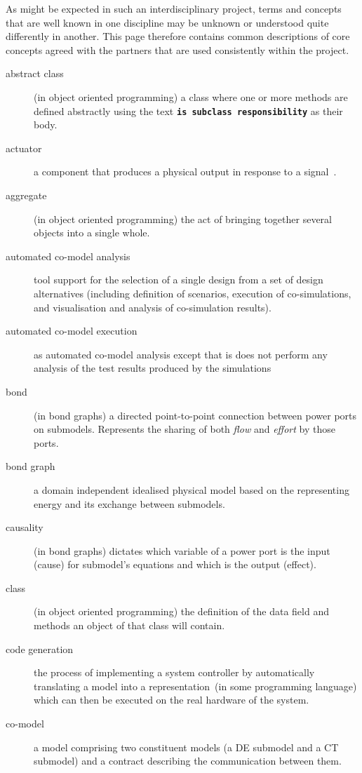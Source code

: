 \documentclass{crescendorepchap}
\begin{document}
As might be expected in such an interdisciplinary project, terms and
concepts that are well known in one discipline may be unknown or
understood quite differently in another. This page therefore contains
common descriptions of core concepts agreed with the partners that are
used consistently within the project.

\begin{description}
\item[abstract class] (in object oriented programming) a class where one or more methods are defined abstractly using the text \textbf{\texttt{is subclass responsibility}} as their body.
\item[actuator] a component that produces a physical output in response to a signal~\cite{IEEE100}.
\item[aggregate] (in object oriented programming) the act of bringing together several objects into a single whole.
\item[automated co-model analysis] tool support for the selection of a single design from a set of design alternatives (including definition of scenarios, execution of co-simulations, and visualisation and analysis of co-simulation results).
\item[automated co-model execution] as automated co-model analysis except that is does not perform any analysis of the test results produced by the simulations
\item[bond] (in bond graphs) a directed point-to-point connection between power ports on submodels.  Represents the sharing of both \textit{flow} and \textit{effort} by those ports.
\item[bond graph] a domain independent idealised physical model based on the representing energy and its exchange between submodels.
\item[causality] (in bond graphs) dictates which variable of a power port is the input (cause) for submodel's equations and which is the output (effect).
\item[class] (in object oriented programming) the definition of the data field and methods an object of that class will contain.
\item[code generation] the process of implementing a system controller by automatically translating a model into a representation~(in some programming language) which can then be executed on the real hardware of the system.
\item[co-model] a model comprising two constituent models (a DE submodel and a CT submodel) and a contract describing the communication between them.

\end{description}
\end{document}
